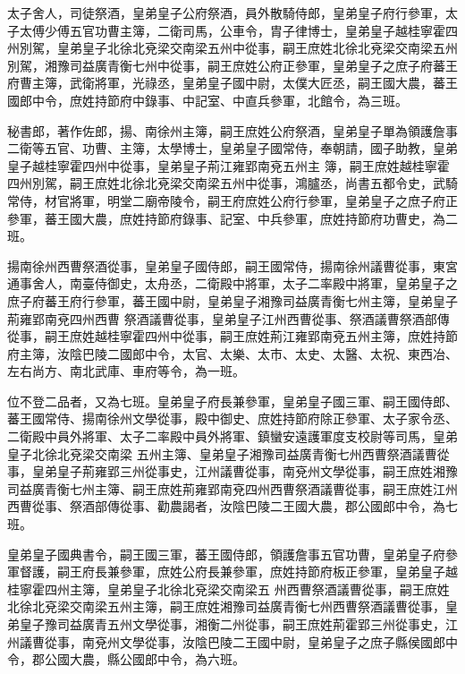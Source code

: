 \begin{pinyinscope}
 太子舍人，司徒祭酒，皇弟皇子公府祭酒，員外散騎侍郎，皇弟皇子府行參軍，太子太傅少傅五官功曹主簿，二衛司馬，公車令，胄子律博士，皇弟皇子越桂寧霍四
 州別駕，皇弟皇子北徐北兗梁交南梁五州中從事，嗣王庶姓北徐北兗梁交南梁五州別駕，湘豫司益廣青衡七州中從事，嗣王庶姓公府正參軍，皇弟皇子之庶子府蕃王府曹主簿，武衛將軍，光祿丞，皇弟皇子國中尉，太僕大匠丞，嗣王國大農，蕃王國郎中令，庶姓持節府中錄事、中記室、中直兵參軍，北館令，為三班。



 秘書郎，著作佐郎，揚、南徐州主簿，嗣王庶姓公府祭酒，皇弟皇子單為領護詹事二衛等五官、功曹、主簿，太學博士，皇弟皇子國常侍，奉朝請，國子助教，皇弟皇子越桂寧霍四州中從事，皇弟皇子荊江雍郢南兗五州主
 簿，嗣王庶姓越桂寧霍四州別駕，嗣王庶姓北徐北兗梁交南梁五州中從事，鴻臚丞，尚書五都令史，武騎常侍，材官將軍，明堂二廟帝陵令，嗣王府庶姓公府行參軍，皇弟皇子之庶子府正參軍，蕃王國大農，庶姓持節府錄事、記室、中兵參軍，庶姓持節府功曹史，為二班。



 揚南徐州西曹祭酒從事，皇弟皇子國侍郎，嗣王國常侍，揚南徐州議曹從事，東宮通事舍人，南臺侍御史，太舟丞，二衛殿中將軍，太子二率殿中將軍，皇弟皇子之庶子府蕃王府行參軍，蕃王國中尉，皇弟皇子湘豫司益廣青衡七州主簿，皇弟皇子荊雍郢南兗四州西曹
 祭酒議曹從事，皇弟皇子江州西曹從事、祭酒議曹祭酒部傳從事，嗣王庶姓越桂寧霍四州中從事，嗣王庶姓荊江雍郢南兗五州主簿，庶姓持節府主簿，汝陰巴陵二國郎中令，太官、太樂、太市、太史、太醫、太祝、東西冶、左右尚方、南北武庫、車府等令，為一班。



 位不登二品者，又為七班。皇弟皇子府長兼參軍，皇弟皇子國三軍、嗣王國侍郎、蕃王國常侍、揚南徐州文學從事，殿中御史、庶姓持節府除正參軍、太子家令丞、二衛殿中員外將軍、太子二率殿中員外將軍、鎮蠻安遠護軍度支校尉等司馬，皇弟皇子北徐北兗梁交南梁
 五州主簿、皇弟皇子湘豫司益廣青衡七州西曹祭酒議曹從事，皇弟皇子荊雍郢三州從事史，江州議曹從事，南兗州文學從事，嗣王庶姓湘豫司益廣青衡七州主簿、嗣王庶姓荊雍郢南兗四州西曹祭酒議曹從事，嗣王庶姓江州西曹從事、祭酒部傳從事、勸農謁者，汝陰巴陵二王國大農，郡公國郎中令，為七班。



 皇弟皇子國典書令，嗣王國三軍，蕃王國侍郎，領護詹事五官功曹，皇弟皇子府參軍督護，嗣王府長兼參軍，庶姓公府長兼參軍，庶姓持節府板正參軍，皇弟皇子越桂寧霍四州主簿，皇弟皇子北徐北兗梁交南梁五
 州西曹祭酒議曹從事，嗣王庶姓北徐北兗梁交南梁五州主簿，嗣王庶姓湘豫司益廣青衡七州西曹祭酒議曹從事，皇弟皇子豫司益廣青五州文學從事，湘衡二州從事，嗣王庶姓荊霍郢三州從事史，江州議曹從事，南兗州文學從事，汝陰巴陵二王國中尉，皇弟皇子之庶子縣侯國郎中令，郡公國大農，縣公國郎中令，為六班。




\end{pinyinscope}
